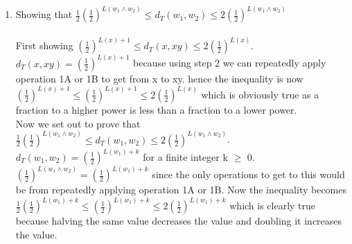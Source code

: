 \documentclass[,oneside]{article}
\numberwithin{equation}{section}
\begin{document}
\begin{enumerate}[label=(\roman*)]
\item Showing that $\frac{1}{2}(\frac{1}{2})^{L(w_1 \wedge w_2)} \leq d_T(w_1,w_2) \leq 2(\frac{1}{2})^{L(w_1 \wedge w_2)}$\\
\\First showing $(\frac{1}{2})^{L(x)+1} \leq d_T(x,xy) \leq 2(\frac{1}{2})^{L(x)}$. $d_T(x,xy)=(\frac{1}{2})^{L(x)+1}$ because using step 2 we can repeatedly apply operation 1A or 1B to get from x to xy. hence the inequality is now $(\frac{1}{2})^{L(x)+1} \leq (\frac{1}{2})^{L(x)+1} \leq 2(\frac{1}{2})^{L(x)}$ which is obviously true as a fraction to a higher power is less than a fraction to a lower power. \\
Now we set out to prove that $\frac{1}{2}(\frac{1}{2})^{L(w_1 \wedge w_2)} \leq d_T(w_1,w_2) \leq 2(\frac{1}{2})^{L(w_1 \wedge w_2)}$. $d_T(w_1,w_2)=(\frac{1}{2})^{L(w_1)+k}$ for a finite integer k $\geq$ 0. $(\frac{1}{2})^{L(w_1 \wedge w_2)} = (\frac{1}{2})^{L(w_1)+k}$ since the only operations to get to this would be from repeatedly applying operation 1A or 1B. Now the inequality becomes $\frac{1}{2}(\frac{1}{2})^{L(w_1)+k} \leq (\frac{1}{2})^{L(w_1)+k} \leq 2(\frac{1}{2})^{L(w_1)+k}$ which is clearly true because halving the same value decreases the value and doubling it increases the value.
\end{enumerate}
\end{document}
